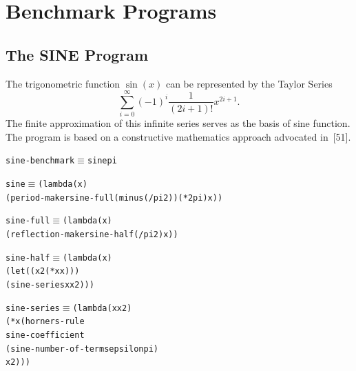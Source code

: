 \chapter{Benchmark Programs}

\section{The SINE Program}

The trigonometric function \(\sin(x)\) can be represented by the Taylor Series
\[
\sum_{i=0}^{\infty}(-1)^i \frac{1}{(2i+1)!}x^{2i+1}.
\]
The finite approximation of this infinite series serves as the basis of sine
function. The  program is based on a constructive mathematics approach
advocated in~[51].
\par\medskip
\noindent\begin{minipage}{\linewidth}
\begin{alltt}
sine-benchmark \(\equiv\) sine pi
\end{alltt}
\end{minipage}\par\bigskip

\noindent\begin{minipage}{\linewidth}
\begin{alltt}
sine \(\equiv\) (lambda (x)
         (period-maker sine-full (minus (/ pi 2)) (* 2 pi) x))
\end{alltt}
\end{minipage}\par\bigskip

\noindent\begin{minipage}{\linewidth}
\begin{alltt}
sine-full \(\equiv\) (lambda (x)
              (reflection-maker sine-half (/ pi 2) x))
\end{alltt}
\end{minipage}\par\bigskip

\noindent\begin{minipage}{\linewidth}
\begin{alltt}
sine-half \(\equiv\) (lambda (x)
              (let ((x2 (* x x)))
                (sine-series x x2)))
\end{alltt}
\end{minipage}\par\bigskip

\noindent\begin{minipage}{\linewidth}
\begin{alltt}
sine-series \(\equiv\) (lambda (x x2)
                (* x (horners-rule
                         sine-coefficient
                         (sine-number-of-terms epsilon pi)
                         x2)))
\end{alltt}
\end{minipage}\par\bigskip

